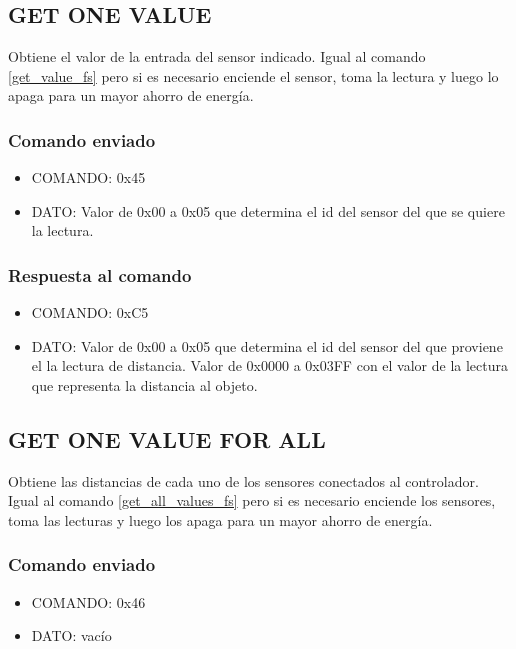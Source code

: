 \documentclass[a4paper,10pt]{article}
\begin{document}
\subsection{GET ONE VALUE}
\label{get_one_value_fs}

Obtiene el valor de la entrada del sensor indicado.
Igual al comando \ref{get_value_fs} pero si es necesario enciende el sensor, toma la lectura y luego lo apaga para un mayor ahorro de energ\'ia.

\subsubsection*{Comando enviado}

\begin{itemize}
	\item{COMANDO:} 0x45
	\item{DATO:} Valor de 0x00 a 0x05 que determina el id del sensor del que se quiere la lectura.
\end{itemize}

\subsubsection*{Respuesta al comando}

\begin{itemize}
	\item{COMANDO:} 0xC5
	\item{DATO:} Valor de 0x00 a 0x05 que determina el id del sensor del que proviene el la lectura de distancia.
	Valor de 0x0000 a 0x03FF con el valor de la lectura que representa la distancia al objeto.
\end{itemize}

\subsection{GET ONE VALUE FOR ALL}
\label{get_one_values_for_all_fs}

Obtiene las distancias de cada uno de los sensores conectados al controlador.
Igual al comando \ref{get_all_values_fs} pero si es necesario enciende los sensores, toma las lecturas y luego los apaga para un mayor ahorro de energ\'ia.

\subsubsection*{Comando enviado}

\begin{itemize}
	\item{COMANDO:} 0x46
	\item{DATO:} vac\'io
\end{itemize}
\end{document}

